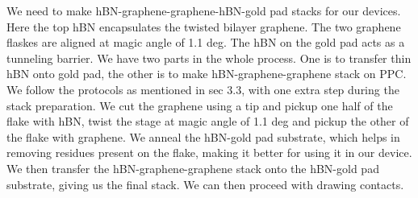 We need to make hBN-graphene-graphene-hBN-gold pad stacks for our devices. Here the top hBN encapsulates the twisted bilayer graphene. The two graphene flaskes are aligned at magic angle of 1.1 deg. The hBN on the gold pad acts as a tunneling barrier. We have two parts in the whole process. One is to transfer thin hBN onto gold pad, the other is to make hBN-graphene-graphene stack on PPC. We follow the protocols as mentioned in sec 3.3, with one extra step during the stack preparation. We cut the graphene using a tip and pickup one half of the flake with hBN, twist the stage at magic angle of 1.1 deg and pickup the other of the flake with graphene. We anneal the hBN-gold pad substrate, which helps in removing residues present on the flake, making it better for using it in our device. We then transfer the hBN-graphene-graphene stack onto the hBN-gold pad substrate, giving us the final stack. We can then proceed with drawing contacts. 